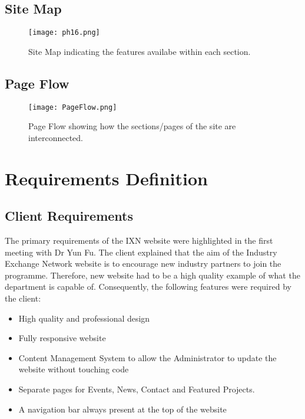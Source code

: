 \documentclass[fontsize=11pt]{extarticle}
\numberwithin{figure}{section} %
\providecommand{\tightlist}{%
  \setlength{\itemsep}{0pt}\setlength{\parskip}{0pt}}
\begin{document}
\hypertarget{site-map}{%
\subsection{Site Map}\label{site-map}}

\begin{figure}[H]
      \centering
      \texttt{[image: ph16.png]}
      \caption{Site Map indicating the features availabe within each section.}
      \label{sitemap}
 \end{figure}

\hypertarget{page-flow}{%
\subsection{Page Flow}\label{page-flow}}

\begin{figure}[H]
      \centering
      \texttt{[image: PageFlow.png]}
      \caption{Page Flow showing how the sections/pages of the site are interconnected. }
      \label{pageflow}
 \end{figure}

\newpage

\hypertarget{requirements-definition}{%
\section{Requirements Definition}\label{requirements-definition}}

\hypertarget{client-requirements}{%
\subsection{Client Requirements}\label{client-requirements}}

The primary requirements of the IXN website were highlighted in the
first meeting with Dr Yun Fu. The client explained that the aim of the
Industry Exchange Network website is to encourage new industry partners
to join the programme. Therefore, new website had to be a high quality
example of what the department is capable of. Consequently, the
following features were required by the client:

\begin{itemize}
\tightlist
\item
  High quality and professional design
\item
  Fully responsive website
\item
  Content Management System to allow the Administrator to update the
  website without touching code
\item
  Separate pages for Events, News, Contact and Featured Projects.
\item
  A navigation bar always present at the top of the website
\end{itemize}
\end{document}

